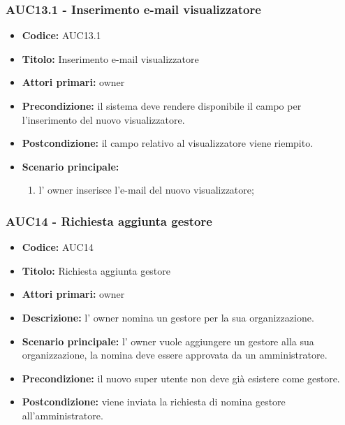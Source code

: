 \documentclass[casi-duso]{subfiles}
\begin{document}
\subsubsection{AUC13.1 - Inserimento e-mail visualizzatore}%
\label{subsub:AUC13.1}
\begin{itemize}
  \item \textbf{Codice:} AUC13.1
  \item \textbf{Titolo:} Inserimento e-mail visualizzatore
  \item \textbf{Attori primari:} owner
  \item \textbf{Precondizione:} il sistema deve rendere disponibile il campo per l'inserimento del nuovo visualizzatore.
  \item \textbf{Postcondizione:} il campo relativo al visualizzatore viene riempito.
  \item \textbf{Scenario principale:} 
  \begin{enumerate}
    \item l' owner inserisce l'e-mail del nuovo visualizzatore;
  \end{enumerate}
\end{itemize}

\subsubsection{AUC14 - Richiesta aggiunta gestore}%
\label{subsub:AUC14}
\begin{itemize}
  \item \textbf{Codice:} AUC14
  \item \textbf{Titolo:} Richiesta aggiunta gestore
  \item \textbf{Attori primari:} owner
  \item \textbf{Descrizione:} l' owner nomina un gestore per la sua organizzazione.
  \item \textbf{Scenario principale:} l' owner vuole aggiungere un gestore alla sua organizzazione, la nomina deve essere approvata da un amministratore.
  \item \textbf{Precondizione:} il nuovo super utente non deve già esistere come gestore.
  \item \textbf{Postcondizione:} viene inviata la richiesta di nomina gestore all'amministratore.
\end{itemize}
\end{document}
